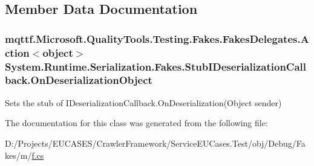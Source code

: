 \subsection{Member Data Documentation}
\hypertarget{class_system_1_1_runtime_1_1_serialization_1_1_fakes_1_1_stub_i_deserialization_callback_a0876c17b5a8e8ce1c31f10f903833c1d}{
\subsubsection[{On\-Deserialization\-Object}]{\setlength{\rightskip}{0pt plus 5cm}mqttf.\-Microsoft.\-Quality\-Tools.\-Testing.\-Fakes.\-Fakes\-Delegates.\-Action$<$object$>$ System.\-Runtime.\-Serialization.\-Fakes.\-Stub\-I\-Deserialization\-Callback.\-On\-Deserialization\-Object}}\label{class_system_1_1_runtime_1_1_serialization_1_1_fakes_1_1_stub_i_deserialization_callback_a0876c17b5a8e8ce1c31f10f903833c1d}


Sets the stub of I\-Deserialization\-Callback.\-On\-Deserialization(\-Object sender)



The documentation for this class was generated from the following file\-:\begin{DoxyCompactItemize}
\item 
D\-:/\-Projects/\-E\-U\-C\-A\-S\-E\-S/\-Crawler\-Framework/\-Service\-E\-U\-Cases.\-Test/obj/\-Debug/\-Fakes/m/\hyperlink{m_2f_8cs}{f.\-cs}\end{DoxyCompactItemize}

